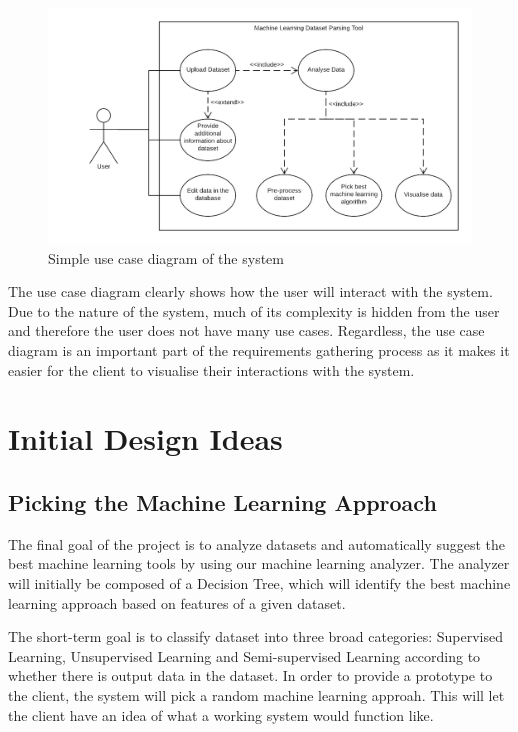 \documentclass[titlepage]{article}
\begin{document}
\begin{figure}[h!]
  \centering
  \includegraphics[width=\textwidth]{usecase}
  \caption{Simple use case diagram of the system}
  \label{usecase}
\end{figure}

The use case diagram clearly shows how the user will interact with the system. Due to the nature of the system, much of its complexity is hidden from the user and therefore the user does not have many use cases. Regardless, the use case diagram is an important part of the requirements gathering process as it makes it easier for the client to visualise their interactions with the system.

\section{Initial Design Ideas}
\subsection{Picking the Machine Learning Approach} \label{pickingML}
The final goal of the project is to analyze datasets and automatically suggest the best machine learning tools by using our machine learning analyzer. The analyzer will initially be composed of a Decision Tree, which will identify the best machine learning approach based on features of a given dataset.

The short-term goal is to classify dataset into three broad categories: Supervised Learning, Unsupervised Learning and Semi-supervised Learning according to whether there is output data in the dataset. In order to provide a prototype to the client, the system will pick a random machine learning approah. This will let the client have an idea of what a working system would function like.
\end{document}
